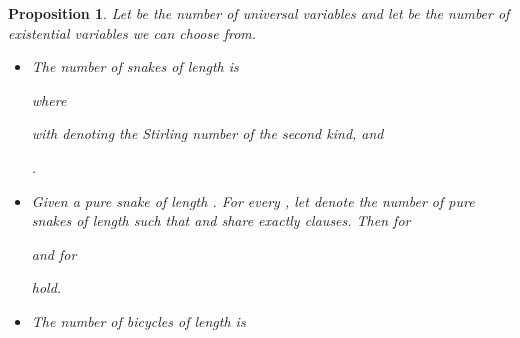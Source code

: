 \documentclass[aop,noinfoline]{imsart}
\newtheorem{proposition}[theorem]{Proposition}
\begin{document}
\begin{proposition}\label{prop:uppercertificatespure}
 Let  be the number of universal variables and let  be the number of existential variables we can choose from. 
  
   \begin{itemize} 
  \item The number of snakes of length  is 

    where
  
  with  denoting the Stirling number of the second kind,
  and 
  
  .

\item Given a pure snake  of length . For every ,  let  denote the number  of pure snakes  of
  length  such that  and  share exactly   clauses.  Then for   

 and for  

hold.

\item The number of bicycles of length    is

\end{itemize}

\end{proposition}
\end{document}
